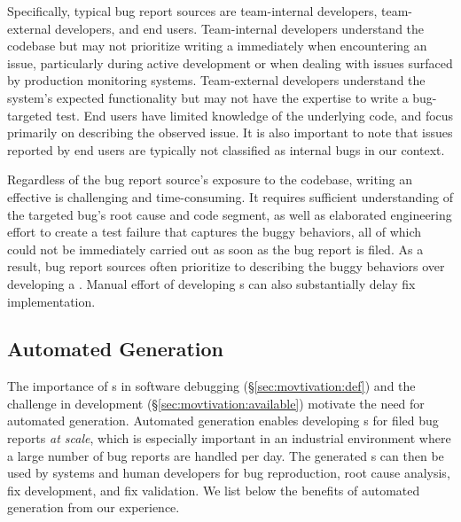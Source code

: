 Specifically, typical bug report sources are team-internal developers, team-external developers, and end users. 
Team-internal developers understand the codebase but may not prioritize writing a \brt immediately when encountering an issue, particularly during active development or when dealing with issues surfaced by production monitoring systems. 
Team-external developers understand the system's expected functionality but may not have the expertise to write a bug-targeted test.
End users have limited knowledge of the underlying code, and focus primarily on describing the observed issue. 
It is also important to note that issues reported by end users are typically not classified as internal bugs in our context.


Regardless of the bug report source's exposure to the codebase, writing an effective \brt is  challenging and time-consuming.
It requires sufficient understanding of the targeted bug's root cause and code segment, as well as elaborated engineering effort to create a test failure that captures the buggy behaviors, all of which could not be immediately carried out as soon as the bug report is filed.
As a result, bug report sources often prioritize to describing the buggy behaviors over developing a \brt.
Manual effort of developing \brt{}s can also substantially delay fix implementation.




\subsection{Automated \brt Generation}
\label{sec:movtivation:need}

The importance of {\brt}s in software debugging (\S\ref{sec:movtivation:def}) and the challenge in \brt development (\S\ref{sec:movtivation:available}) motivate the need for automated \brt generation.
Automated \brt generation enables developing \brt{}s for filed bug reports \textit{at scale}, which is especially important in an industrial environment where a large number of bug reports are handled per day.
The generated \brt{}s can then be used by \autopr systems and human developers for bug reproduction, root cause analysis, fix development, and fix validation.
We list below the benefits of automated \brt generation from our experience.

